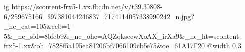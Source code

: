  
 
 
 
 

\ifcmt
  ig https://scontent-frx5-1.xx.fbcdn.net/v/t39.30808-6/259675166_897381044246837_7174114057338990242_n.jpg?_nc_cat=105&ccb=1-5&_nc_sid=8bfeb9&_nc_ohc=AQZqkseewXoAX_irXa9&_nc_ht=scontent-frx5-1.xx&oh=7828f5a195ea81206bf7066109cb5e75&oe=61A17F20
  @width 0.3
\fi
